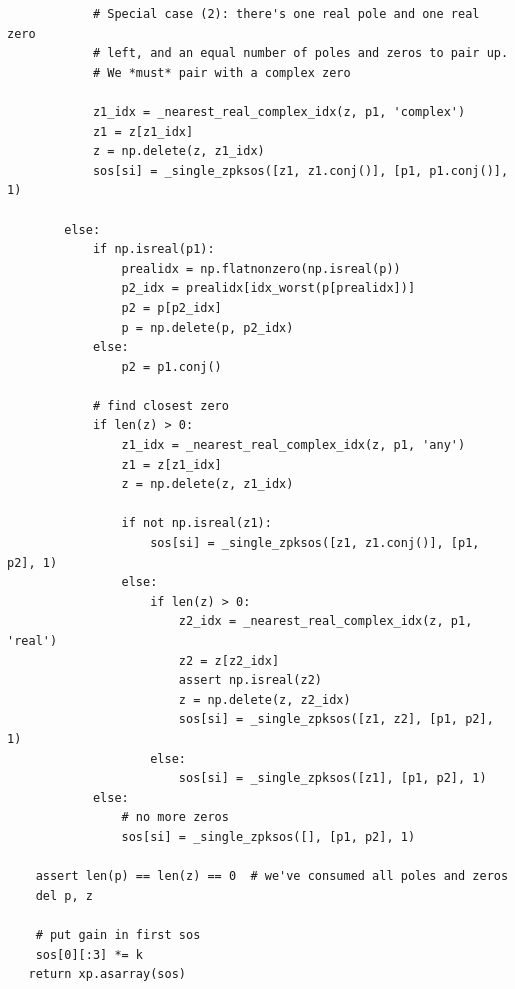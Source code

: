 \documentclass[12pt,a4paper]{article}
\begin{document}
\begin{itemize}
\begin{verbatim}
            # Special case (2): there's one real pole and one real zero
            # left, and an equal number of poles and zeros to pair up.
            # We *must* pair with a complex zero

            z1_idx = _nearest_real_complex_idx(z, p1, 'complex')
            z1 = z[z1_idx]
            z = np.delete(z, z1_idx)
            sos[si] = _single_zpksos([z1, z1.conj()], [p1, p1.conj()], 1)

        else:
            if np.isreal(p1):
                prealidx = np.flatnonzero(np.isreal(p))
                p2_idx = prealidx[idx_worst(p[prealidx])]
                p2 = p[p2_idx]
                p = np.delete(p, p2_idx)
            else:
                p2 = p1.conj()

            # find closest zero
            if len(z) > 0:
                z1_idx = _nearest_real_complex_idx(z, p1, 'any')
                z1 = z[z1_idx]
                z = np.delete(z, z1_idx)

                if not np.isreal(z1):
                    sos[si] = _single_zpksos([z1, z1.conj()], [p1, p2], 1)
                else:
                    if len(z) > 0:
                        z2_idx = _nearest_real_complex_idx(z, p1, 'real')
                        z2 = z[z2_idx]
                        assert np.isreal(z2)
                        z = np.delete(z, z2_idx)
                        sos[si] = _single_zpksos([z1, z2], [p1, p2], 1)
                    else:
                        sos[si] = _single_zpksos([z1], [p1, p2], 1)
            else:
                # no more zeros
                sos[si] = _single_zpksos([], [p1, p2], 1)

    assert len(p) == len(z) == 0  # we've consumed all poles and zeros
    del p, z

    # put gain in first sos
    sos[0][:3] *= k
   return xp.asarray(sos)
\end{verbatim}

    
\end{itemize}
\end{document}
